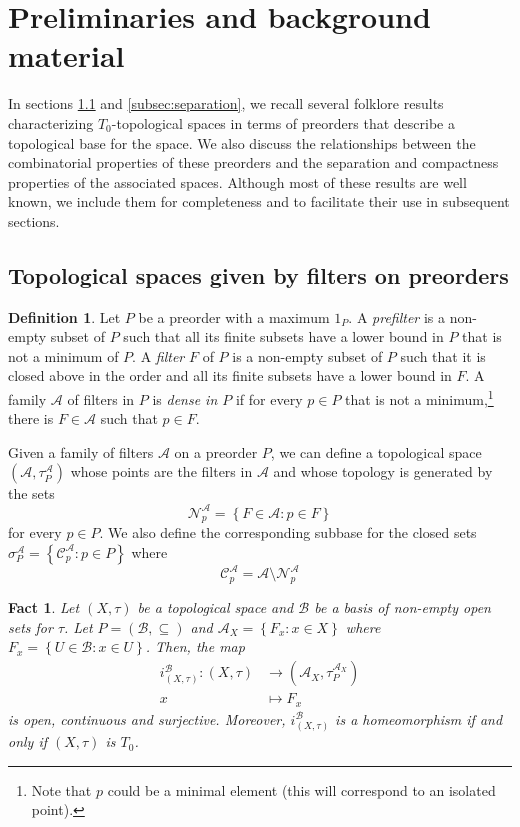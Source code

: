 \documentclass{article}
\newcommand{\aaa}{\mathcal{A} }
\newcommand{\open}[1]{\mathcal{N}^{\mathcal{A}}_{#1}}
\newcommand{\closed}[1]{\mathcal{C}^{\mathcal{A}}_{#1}}
\newcommand{\spa}{\sigma^\aaa_P}
\newcommand{\atpa}{(\aaa, \tau^\aaa_P)}
\theoremstyle{plain}
\newtheorem{fact}[theorem]{Fact}
\theoremstyle{definition}
\newtheorem{definition}[theorem]{Definition}
\theoremstyle{remark}
\newcommand{\bp}[1]{\left\lbrace #1 \right\rbrace}
\newcommand{\0}{\mathbbm 0}
\newcommand{\1}{\mathbbm 1}
\newcommand{\2}{\mathbbm 2}
\begin{document}
\section{Preliminaries and background material}\label{Preliminaries-background}

In sections \ref{subsec:topspacesgivenbyfilters} and \ref{subsec:separation}, we recall several folklore results characterizing $T_0$-topological spaces in terms of preorders that describe a topological base for the space. We also discuss the relationships between the combinatorial properties of these preorders and the separation and compactness properties of the associated spaces. Although most of these results are well known, we include them for completeness and to facilitate their use in subsequent sections.

\subsection{Topological spaces given by filters on preorders}
\label{subsec:topspacesgivenbyfilters}





\begin{definition}
\label{def:densefamilyfilters}
    Let $P$ be a preorder with a maximum $1_P$. A \emph{prefilter} is a non-empty subset of $P$ such that all its finite subsets have a lower bound in \(P\) that is not a minimum of \(P\). A \emph{filter} $F$ of $P$ is a non-empty subset of \(P\) such that it is closed above in the order and all its finite subsets have a lower bound in \(F\).
% 
A family $\aaa$ of filters in $P$ is \emph{dense in $P$} if for every $p \in P $ that is not a minimum,\footnote{Note that $p$ could be a minimal element (this will correspond to an isolated point).}  there is $F \in \aaa$ such that $p \in F$.
\end{definition}

Given a family of filters $\aaa$ on a preorder $P$, we can define a topological space $\atpa$ whose points are the filters in $\aaa$ and whose topology is generated by the sets 
\[
\open{p}=\bp{F \in \aaa: p \in F}
\]
for every $p \in P$. We also define the corresponding 
subbase for the closed sets  $\spa=\bp{ \closed{p}: p \in P}$ where 
\[
\closed{p}=\aaa \setminus \open{p}
\]

\begin{fact}
\label{fact:omeomspacespreorders}
Let $(X, \tau)$ be a topological space and $\mathcal{B}$ be a basis of non-empty open sets for $\tau$. Let $P=(\mathcal{B}, \subseteq)$ and $\aaa_X=\bp{F_x : x \in X}$ where $F_x=\bp{ U \in \mathcal{B}: x \in U}$. Then, the map 
\begin{align*}
       i_{(X,\tau)}^\mathcal{B}: (X, \tau) &\to (\aaa_X,\tau^{\aaa_X}_P)\\
       x &\mapsto F_x
\end{align*}
is open, continuous and surjective. Moreover, $i_{(X,\tau)}^\mathcal{B}$ is a homeomorphism if and only if $(X,\tau)$ is $T_0$.
\end{fact}
\end{document}
